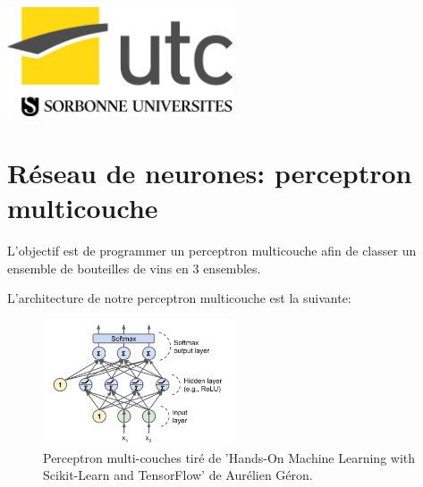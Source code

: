 \documentclass[a4paper,11pt,oneside,roman]{article}
\begin{document}
\begin{titlepage}
        
        \includegraphics[width=0.5\textwidth]{imgs/logo_UTC_SU.jpg}\\[1cm] %
        
        
        \vfill %
        
    \end{titlepage}
    
    
    \pagebreak
        
    \section{Réseau de neurones: perceptron multicouche}
    
    L'objectif est de programmer un perceptron multicouche afin de classer un ensemble de bouteilles de vins en 3 ensembles.

    L'architecture de notre perceptron multicouche est la suivante:
    \begin{figure}
        \centering
        \includegraphics[width=0.5\textwidth]{imgs/perceptron.png}
        \caption{Perceptron multi-couches tiré de 'Hands-On Machine Learning with Scikit-Learn and TensorFlow' de Aurélien Géron.}
        \label{fig_perceptron}
    \end{figure}
\end{document}
